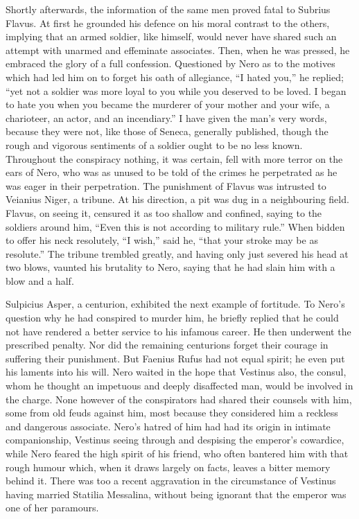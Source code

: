 
Shortly afterwards, the information of the same men proved fatal to Subrius Flavus. At first he grounded his defence on his moral contrast to the others, implying that an armed soldier, like himself, would never have shared such an attempt with unarmed and effeminate associates. Then, when he was pressed, he embraced the glory of a full confession. Questioned by Nero as to the motives which had led him on to forget his oath of allegiance, ``I hated you,'' he replied; ``yet not a soldier was more loyal to you while you deserved to be loved. I began to hate you when you became the murderer of your mother and your wife, a charioteer, an actor, and an incendiary.'' I have given the man's very words, because they were not, like those of Seneca, generally published, though the rough and vigorous sentiments of a soldier ought to be no less known. Throughout the conspiracy nothing, it was certain, fell with more terror on the ears of Nero, who was as unused to be told of the crimes he perpetrated as he was eager in their perpetration. The punishment of Flavus was intrusted to Veianius Niger, a tribune. At his direction, a pit was dug in a neighbouring field. Flavus, on seeing it, censured it as too shallow and confined, saying to the soldiers around him, ``Even this is not according to military rule.'' When bidden to offer his neck resolutely, ``I wish,'' said he, ``that your stroke may be as resolute.'' The tribune trembled greatly, and having only just severed his head at two blows, vaunted his brutality to Nero, saying that he had slain him with a blow and a half.


Sulpicius Asper, a centurion, exhibited the next example of fortitude. To Nero's question why he had conspired to murder him, he briefly replied that he could not have rendered a better service to his infamous career. He then underwent the prescribed penalty. Nor did the remaining centurions forget their courage in suffering their punishment. But Faenius Rufus had not equal spirit; he even put his laments into his will. Nero waited in the hope that Vestinus also, the consul, whom he thought an impetuous and deeply disaffected man, would be involved in the charge. None however of the conspirators had shared their counsels with him, some from old feuds against him, most because they considered him a reckless and dangerous associate. Nero's hatred of him had had its origin in intimate companionship, Vestinus seeing through and despising the emperor's cowardice, while Nero feared the high spirit of his friend, who often bantered him with that rough humour which, when it draws largely on facts, leaves a bitter memory behind it. There was too a recent aggravation in the circumstance of Vestinus having married Statilia Messalina, without being ignorant that the emperor was one of her paramours.

